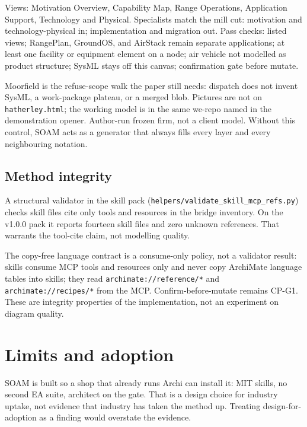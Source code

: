 \documentclass[10pt,journal,compsoc]{IEEEtran}
\begin{document}
Views: Motivation Overview, Capability Map, Range Operations, Application Support, Technology and Physical. Specialists match the mill cut: motivation and technology-physical in; implementation and migration out. Pass checks: listed views; RangePlan, GroundOS, and AirStack remain separate applications; at least one facility or equipment element on a node; air vehicle not modelled as product structure; SysML stays off this canvas; confirmation gate before mutate.

Moorfield is the refuse-scope walk the paper still needs: dispatch does not invent SysML, a work-package plateau, or a merged blob. Pictures are not on \texttt{hatherley.html}; the working model is in the same we-repo named in the demonstration opener. Author-run frozen firm, not a client model. Without this control, SOAM acts as a generator that always fills every layer and every neighbouring notation.

\subsection{Method integrity}

A structural validator in the skill pack (\texttt{helpers/validate\_skill\_mcp\_refs.py}) checks skill files cite only tools and resources in the bridge inventory. On the v1.0.0 pack it reports fourteen skill files and zero unknown references. That warrants the tool-cite claim, not modelling quality.

The copy-free language contract is a consume-only policy, not a validator result: skills consume MCP tools and resources only and never copy ArchiMate language tables into skills; they read \texttt{archimate://reference/*} and \texttt{archimate://recipes/*} from the MCP. Confirm-before-mutate remains CP-G1. These are integrity properties of the implementation, not an experiment on diagram quality.

\section{Limits and adoption}
\label{sec:limits}

SOAM is built so a shop that already runs Archi can install it: MIT skills, no second EA suite, architect on the gate. That is a design choice for industry uptake, not evidence that industry has taken the method up. Treating design-for-adoption as a finding would overstate the evidence.
\end{document}
